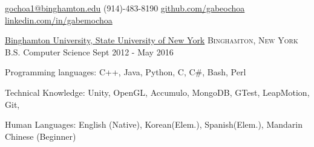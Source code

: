 \documentclass[11pt]{article}
\begin{document}


\nobreakvspace{0.3em}  %

\href{mailto:gochoa1@binghamton.edu}{gochoa1@binghamton.edu}\sbull
(914)-483-8190\sbull
\href{https://github.com/gabeochoa}{github.com/gabeochoa}\sbull
\href{https://www.linkedin.com/in/gabemochoa}{linkedin.com/in/gabemochoa}


\spacedhrule{0.1em}{0.5em}  %

\headedsection
{\href{http://www.binghamton.edu/index.php}{Binghamton University, State University of New York}}
{\textsc{Binghamton, New York}} {
    \inlineheadrightdate
    {B.S. Computer Science}
    {Sept 2012 - May 2016}
}


\spacedhrule{0.1em}{0.5em}  %

\inlineheadsection  %
{Programming languages:}
{ C++, Java,  Python, C, C\#, Bash, Perl }

\inlineheadsection
{Technical Knowledge:}
{ Unity, OpenGL, Accumulo, MongoDB, GTest, LeapMotion, Git, \latex }

\inlineheadsection
{Human Languages:}
{English (Native), Korean(Elem.), Spanish(Elem.), Mandarin Chinese (Beginner)}


\spacedhrule{0.1em}{0.5em}  %
\end{document}

